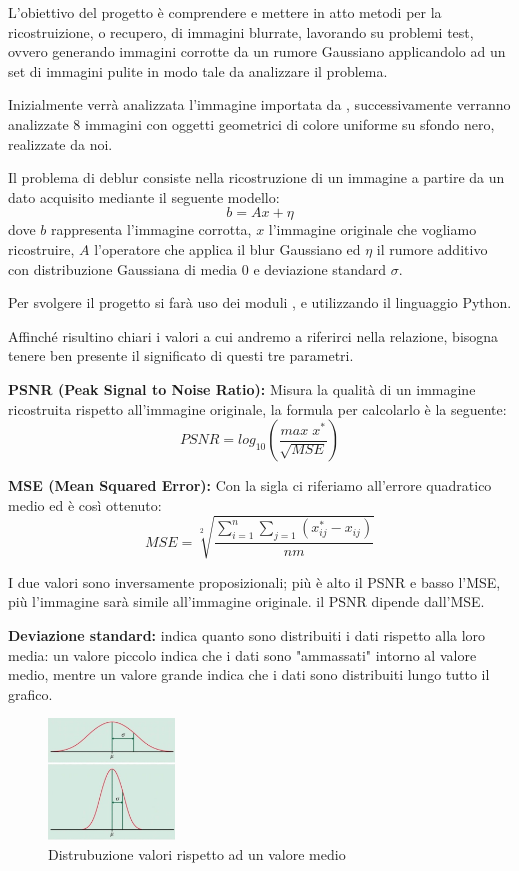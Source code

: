 L'obiettivo del progetto è comprendere e mettere in atto metodi per la ricostruizione, o recupero, di 
immagini blurrate, lavorando su problemi test, ovvero generando immagini corrotte da un rumore 
Gaussiano applicandolo ad un set di immagini pulite in modo tale da analizzare il problema. 

Inizialmente verrà analizzata l'immagine  importata da
, successivamente verranno analizzate 8 immagini con oggetti geometrici
 di colore uniforme su sfondo nero, realizzate da noi.

Il problema di deblur consiste nella ricostruzione di un immagine a partire da un dato acquisito
 mediante il seguente modello:
\[b=Ax+\eta\]
dove $b$ rappresenta l'immagine corrotta, $x$ l'immagine originale che vogliamo ricostruire, $A$ 
l'operatore che applica il blur Gaussiano ed $\eta$ il rumore additivo con distribuzione Gaussiana di
 media 0 e deviazione standard $\sigma$.

Per svolgere il progetto si farà uso dei moduli ,  e 
utilizzando il linguaggio Python.

Affinché risultino chiari i valori a cui andremo a riferirci nella relazione, bisogna tenere ben presente 
il significato di questi tre parametri. 

\textbf{PSNR (Peak Signal to Noise Ratio):} Misura la qualità di un immagine ricostruita rispetto all'immagine 
originale, la formula per calcolarlo è la seguente: \[PSNR = log_{10}(\frac{max\;x^\ast}{\sqrt{MSE}})\]

\textbf{MSE (Mean Squared Error):}  Con la sigla ci riferiamo all'errore quadratico medio ed è così ottenuto:
 \[MSE = \sqrt[2]{\frac{\sum_{i=1}^n\sum_{j=1}(x^{\ast}_{ij}-x_{ij})}{nm}}\]

I due valori sono inversamente proposizionali; più è alto il PSNR e basso l'MSE, più l'immagine sarà 
simile all'immagine originale. il PSNR dipende dall'MSE.

\textbf{Deviazione standard:} indica quanto sono distribuiti i dati rispetto alla loro media: 
un valore piccolo indica che i dati sono "ammassati" intorno al valore medio, 
mentre un valore grande indica che i dati sono distribuiti lungo tutto il grafico.

\begin{figure}[H]\centering
	\includegraphics[width=0.3\textwidth]{MANCANTI/deviazione standard.jpg}
	\caption{Distrubuzione valori rispetto ad un valore medio}
\end{figure}